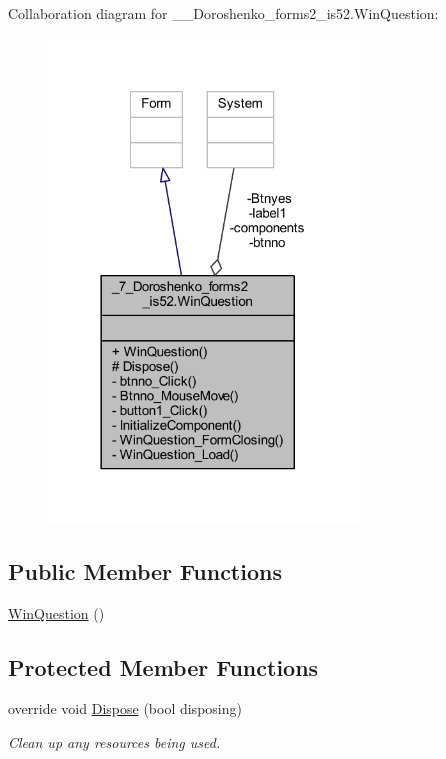 Collaboration diagram for \+\_\+\_\+\+Doroshenko\+\_\+forms2\+\_\+is52.\+Win\+Question\+:
\nopagebreak
\begin{figure}[H]
\begin{center}
\leavevmode
\includegraphics[width=234pt]{class__7___doroshenko__forms2__is52_1_1_win_question__coll__graph}
\end{center}
\end{figure}
\subsection*{Public Member Functions}
\begin{DoxyCompactItemize}
\item 
\hyperlink{class__7___doroshenko__forms2__is52_1_1_win_question_a0e982bdaeb60f44ace79f96fd3893fa0}{Win\+Question} ()
\end{DoxyCompactItemize}
\subsection*{Protected Member Functions}
\begin{DoxyCompactItemize}
\item 
override void \hyperlink{class__7___doroshenko__forms2__is52_1_1_win_question_a93e9d7abadf814c67abe1da4b406039b}{Dispose} (bool disposing)
\begin{DoxyCompactList}\small\item\em Clean up any resources being used. \end{DoxyCompactList}\end{DoxyCompactItemize}
